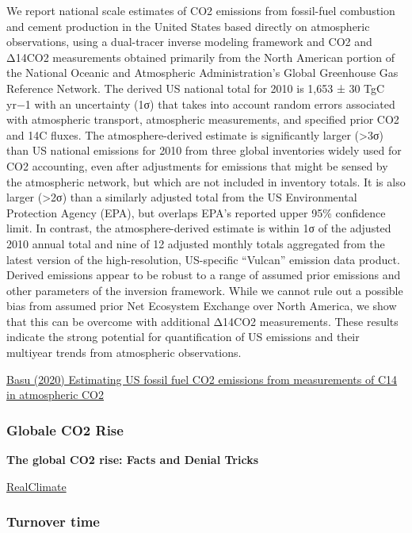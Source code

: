 \documentclass[
]{book}
\begin{document}
We report national scale estimates of CO2 emissions from fossil-fuel combustion and cement production in the United States based directly on atmospheric observations, using a dual-tracer inverse modeling framework and CO2 and Δ14CO2 measurements obtained primarily from the North American portion of the National Oceanic and Atmospheric Administration's Global Greenhouse Gas Reference Network. The derived US national total for 2010 is 1,653 ± 30 TgC yr−1 with an uncertainty (1σ) that takes into account random errors associated with atmospheric transport, atmospheric measurements, and specified prior CO2 and 14C fluxes. The atmosphere-derived estimate is significantly larger (\textgreater3σ) than US national emissions for 2010 from three global inventories widely used for CO2 accounting, even after adjustments for emissions that might be sensed by the atmospheric network, but which are not included in inventory totals. It is also larger (\textgreater2σ) than a similarly adjusted total from the US Environmental Protection Agency (EPA), but overlaps EPA's reported upper 95\% confidence limit. In contrast, the atmosphere-derived estimate is within 1σ of the adjusted 2010 annual total and nine of 12 adjusted monthly totals aggregated from the latest version of the high-resolution, US-specific ``Vulcan'' emission data product. Derived emissions appear to be robust to a range of assumed prior emissions and other parameters of the inversion framework. While we cannot rule out a possible bias from assumed prior Net Ecosystem Exchange over North America, we show that this can be overcome with additional Δ14CO2 measurements. These results indicate the strong potential for quantification of US emissions and their multiyear trends from atmospheric observations.

\href{https://www.pnas.org/content/117/24/13300}{Basu (2020) Estimating US fossil fuel CO2 emissions from measurements of C14 in atmospheric CO2}

\hypertarget{globale-co2-rise}{%
\subsubsection{Globale CO2 Rise}\label{globale-co2-rise}}

\textbf{The global CO2 rise: Facts and Denial Tricks}

\href{https://www.realclimate.org/index.php/archives/2018/01/the-global-co2-rise-the-facts-exxon-and-the-favorite-denial-tricks/}{RealClimate}

\hypertarget{turnover-time}{%
\subsubsection{Turnover time}\label{turnover-time}}
\end{document}
